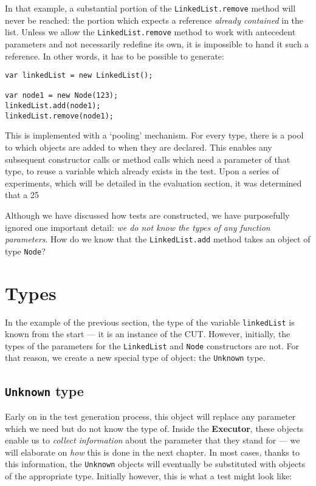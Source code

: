 In that example, a substantial portion of the \texttt{LinkedList.remove} method will never be reached: the portion which expects a reference \emph{already contained} in the list. Unless we allow the \texttt{LinkedList.remove} method to work with antecedent parameters and not necessarily redefine its own, it is impossible to hand it such a reference. In other words, it has to be possible to generate:

\begin{lstlisting}
var linkedList = new LinkedList();

var node1 = new Node(123);
linkedList.add(node1);
linkedList.remove(node1);
\end{lstlisting}

This is implemented with a `pooling' mechanism. For every type, there is a pool to which objects are added to when they are declared. This enables any subsequent constructor calls or method calls which need a parameter of that type, to reuse a variable which already exists in the test. Upon a series of experiments, which will be detailed in the evaluation section, it was determined that a 25%

Although we have discussed how tests are constructed, we have purposefully ignored one important detail: \emph{we do not know the types of any function parameters}. How do we know that the \texttt{LinkedList.add} method takes an object of type \texttt{Node}?

\section{Types}

In the example of the previous section, the type of the variable \texttt{linkedList} is known from the start --- it is an instance of the CUT. However, initially, the types of the parameters for the \texttt{LinkedList} and \texttt{Node} constructors are not. For that reason, we create a new special type of object: the \texttt{Unknown} type.

\subsection{\texttt{Unknown} type}

Early on in the test generation process, this object will replace any parameter which we need but do not know the type of. Inside the \textbf{Executor}, these objects enable us to \emph{collect information} about the parameter that they stand for --- we will elaborate on \emph{how} this is done in the next chapter. In most cases, thanks to this information, the \texttt{Unknown} objects will eventually be substituted with objects of the appropriate type. Initially however, this is what a test might look like:

